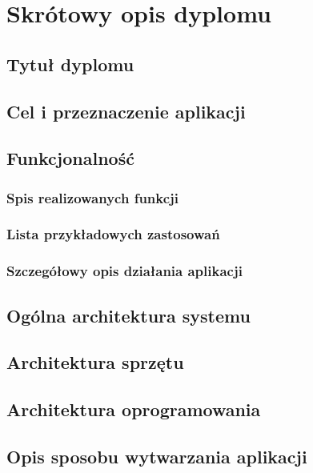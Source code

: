 \chapter[Dodatek A]{Skrótowy opis dyplomu}
\section{Tytuł dyplomu}

\section{Cel i przeznaczenie aplikacji}

\section{Funkcjonalność}
\subsection{Spis realizowanych funkcji}

\subsection{Lista przykładowych zastosowań}

\subsection{Szczegółowy opis działania aplikacji}

\section{Ogólna architektura systemu}

\section{Architektura sprzętu}

\section{Architektura oprogramowania}

\section{Opis sposobu wytwarzania aplikacji}

